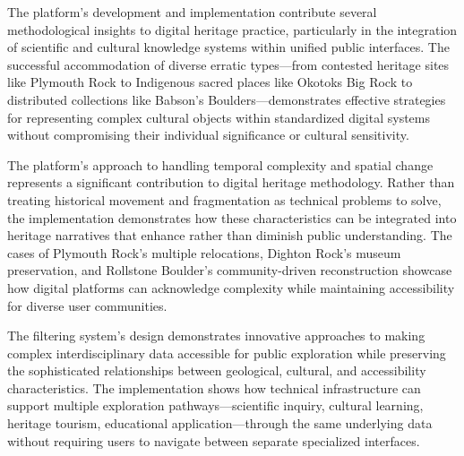 The platform's development and implementation contribute several methodological insights to digital heritage practice, particularly in the integration of scientific and cultural knowledge systems within unified public interfaces. The successful accommodation of diverse erratic types—from contested heritage sites like Plymouth Rock to Indigenous sacred places like Okotoks Big Rock to distributed collections like Babson's Boulders—demonstrates effective strategies for representing complex cultural objects within standardized digital systems without compromising their individual significance or cultural sensitivity.

The platform's approach to handling temporal complexity and spatial change represents a significant contribution to digital heritage methodology. Rather than treating historical movement and fragmentation as technical problems to solve, the implementation demonstrates how these characteristics can be integrated into heritage narratives that enhance rather than diminish public understanding. The cases of Plymouth Rock's multiple relocations, Dighton Rock's museum preservation, and Rollstone Boulder's community-driven reconstruction showcase how digital platforms can acknowledge complexity while maintaining accessibility for diverse user communities.


The filtering system's design demonstrates innovative approaches to making complex interdisciplinary data accessible for public exploration while preserving the sophisticated relationships between geological, cultural, and accessibility characteristics. The implementation shows how technical infrastructure can support multiple exploration pathways—scientific inquiry, cultural learning, heritage tourism, educational application—through the same underlying data without requiring users to navigate between separate specialized interfaces.

